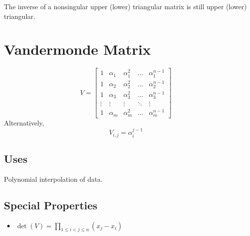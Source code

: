 The inverse of a nonsingular upper (lower) triangular matrix is still upper (lower) triangular.




\section{Vandermonde Matrix}
\begin{equation}
V=
\begin{bmatrix}
1      & \alpha_1 & \alpha_1^2 & \dots  & \alpha_1^{n-1} \\
1      & \alpha_2 & \alpha_2^2 & \dots  & \alpha_2^{n-1} \\
1      & \alpha_3 & \alpha_3^2 & \dots  & \alpha_3^{n-1} \\
\vdots & \vdots   & \vdots     & \ddots & \vdots         \\
1      & \alpha_m & \alpha_m^2 & \dots  & \alpha_m^{n-1}
\end{bmatrix}
\end{equation}
Alternatively,
\begin{equation}
V_{i,j} = \alpha_i^{j-1}
\end{equation}

\subsection*{Uses}
Polynomial interpolation of data.

\subsection*{Special Properties}
\begin{itemize}
\item $\det(V)=\prod_{1\le i < j \le n} (x_j-x_i)$
\end{itemize}